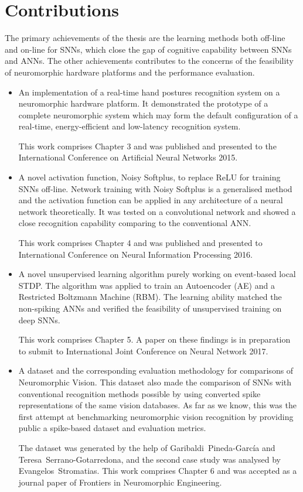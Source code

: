\section{Contributions}
The primary achievements of the thesis are the learning methods both off-line and on-line for SNNs, which close the gap of cognitive capability between SNNs and ANNs.
The other achievements contributes to the concerns of the feasibility of neuromorphic hardware platforms and the performance evaluation.
\begin{itemize}
	\item 
	An implementation of a real-time hand postures recognition system on a neuromorphic hardware platform.
	It demonstrated the prototype of a complete neuromorphic system which may form the default configuration of a real-time, energy-efficient and low-latency recognition system.
	
	This work comprises Chapter 3 and was published and presented to the International Conference on Artificial Neural Networks 2015.
	
	\item 
	A novel activation function, Noisy Softplus, to replace ReLU for training SNNs off-line.
	Network training with Noisy Softplus is a generalised method and the activation function can be applied in any architecture of a neural network theoretically.
	It was tested on a convolutional network and showed a close recognition capability comparing to the conventional ANN. 

	This work comprises Chapter 4 and was published and presented to International Conference on Neural Information Processing 2016.

	\item 
	A novel unsupervised learning algorithm purely working on event-based local STDP.
	The algorithm was applied to train an Autoencoder (AE) and a Restricted Boltzmann Machine (RBM).
	The learning ability matched the non-spiking ANNs and verified the feasibility of unsupervised training on deep SNNs. 
	
	This work comprises Chapter 5.
	A paper on these findings is in preparation to submit to International Joint Conference on Neural Network 2017.
	
	\item 
	A dataset and the corresponding evaluation methodology for comparisons of Neuromorphic Vision.
	This dataset also made the comparison of SNNs with conventional recognition methods possible by using converted spike representations of the same vision databases.
	As far as we know, this was the first attempt at benchmarking neuromorphic vision recognition by providing public a spike-based dataset and evaluation metrics.
	
	The dataset was generated by the help of Garibaldi~Pineda-Garc\'ia and Teresa~Serrano-Gotarredona, and the second case study was analysed by Evangelos~Stromatias.
	This work comprises Chapter 6 and was accepted as a journal paper of Frontiers in Neuromorphic Engineering.
\end{itemize}
